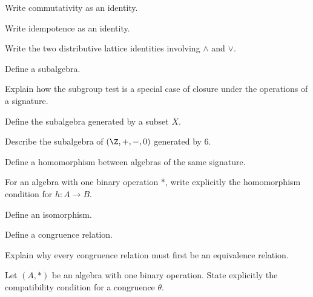 \begin{exercise}[1]
Write commutativity as an identity.
\end{exercise}

\begin{exercise}[1]
Write idempotence as an identity.
\end{exercise}

\begin{exercise}[2]
Write the two distributive lattice identities involving \(\wedge\) and
\(\vee\).
\end{exercise}

\begin{exercise}[1]
Define a subalgebra.
\end{exercise}

\begin{exercise}[2]
Explain how the subgroup test is a special case of closure under the
operations of a signature.
\end{exercise}

\begin{exercise}[1]
Define the subalgebra generated by a subset \(X\).
\end{exercise}

\begin{exercise}[2]
Describe the subalgebra of \((\Z,+,-,0)\) generated by \(6\).
\end{exercise}

\begin{exercise}[1]
Define a homomorphism between algebras of the same signature.
\end{exercise}

\begin{exercise}[2]
For an algebra with one binary operation \(*\), write explicitly the
homomorphism condition for \(h:A\to B\).
\end{exercise}

\begin{exercise}[1]
Define an isomorphism.
\end{exercise}

\begin{exercise}[1]
Define a congruence relation.
\end{exercise}

\begin{exercise}[2]
Explain why every congruence relation must first be an equivalence relation.
\end{exercise}

\begin{exercise}[2]
Let \((A,*)\) be an algebra with one binary operation. State explicitly the
compatibility condition for a congruence \(\theta\).
\end{exercise}

